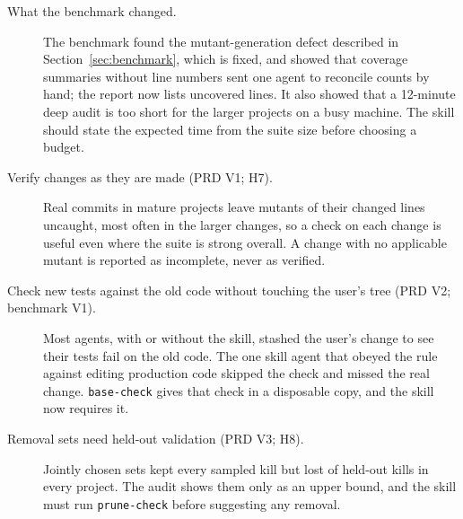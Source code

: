 \begin{description}

  \item[What the benchmark changed.] The benchmark found the mutant-generation defect described in Section~\ref{sec:benchmark}, which is fixed, and showed that coverage summaries without line numbers sent one agent to reconcile counts by hand; the report now lists uncovered lines. It also showed that a 12-minute deep audit is too short for the larger projects on a busy machine. The skill should state the expected time from the suite size before choosing a budget.
  \item[Verify changes as they are made (PRD V1; H7).] Real commits in mature projects leave mutants of their changed lines uncaught, most often in the larger changes, so a check on each change is useful even where the suite is strong overall. A change with no applicable mutant is reported as incomplete, never as verified.
  \item[Check new tests against the old code without touching the user's tree (PRD V2; benchmark V1).] Most agents, with or without the skill, stashed the user's change to see their tests fail on the old code. The one skill agent that obeyed the rule against editing production code skipped the check and missed the real change. \texttt{base-check} gives that check in a disposable copy, and the skill now requires it.
  \item[Removal sets need held-out validation (PRD V3; H8).] Jointly chosen sets kept every sampled kill but lost \HEightLostShare{} of held-out kills in every project. The audit shows them only as an upper bound, and the skill must run \texttt{prune-check} before suggesting any removal.
\end{description}
